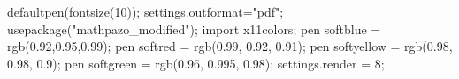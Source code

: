 
\usepackage{asymptote}

\begin{asydef} 
defaultpen(fontsize(10));
settings.outformat="pdf";
usepackage("mathpazo_modified");
import x11colors;
pen softblue = rgb(0.92,0.95,0.99);
pen softred = rgb(0.99, 0.92, 0.91);
pen softyellow = rgb(0.98, 0.98, 0.9);
pen softgreen = rgb(0.96, 0.995, 0.98);
settings.render = 8; 
\end{asydef}

\usepackage{tocloft}
\renewcommand\cftchapafterpnum{\vskip5pt}
\renewcommand\cftsecafterpnum{\vskip5pt}
\renewcommand\cftsubsecafterpnum{\vskip5pt}

\newsavebox{\asybox}
\def\asydir{asy}